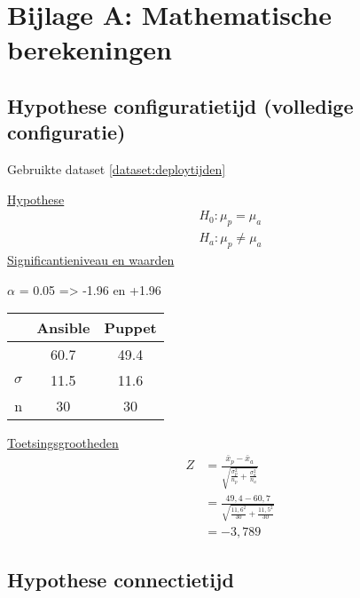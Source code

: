 
\chapter*{Bijlage A: Mathematische berekeningen}
\label{ch:mathematiek}

\section*{Hypothese configuratietijd (volledige configuratie)}
\label{wis:hypothesedeploytijd}

Gebruikte dataset \ref{dataset:deploytijden}

\underline{Hypothese}
\begin{align*}
H_0:  \mu_p = \mu_a \\
H_a: \mu_p\neq \mu_a 
\end{align*}
\underline{Significantieniveau en waarden} \newline

 $\alpha$ = 0.05 => -1.96 en +1.96 \newline

		\begin{tabular}{ r |c |c }
			& Ansible & Puppet\\\hline
			\unexpanded{$ \bar x  $} &  60.7 & 49.4\\ \hline
			$\sigma$ & 11.5 & 11.6\\ \hline
			n &  30 &  30

\end{tabular}


\underline{Toetsingsgrootheden}
\begin{equation} \label{eq1}
\begin{split}
Z &= \tfrac{\bar x_p - \bar x_a}{\sqrt{\tfrac{\sigma_p^2}{n_p}+\tfrac{\sigma_a^2}{n_a}}}\\
& = \tfrac{49,4 - 60,7}{\sqrt{\tfrac{11,6^2}{30}+\tfrac{11,5^2}{30}}} \\
& = -3,789
\end{split}
\end{equation}

\section*{Hypothese connectietijd}
\label{wis:hypotheseconnectietijd}

